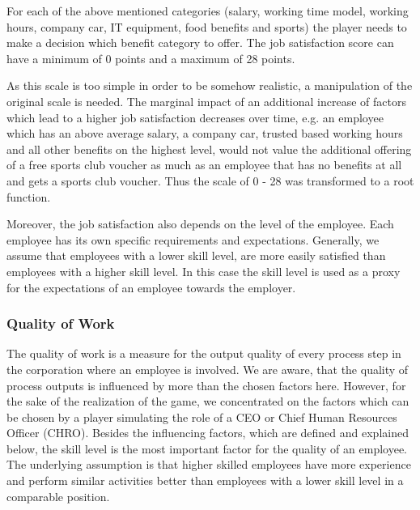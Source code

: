 For each of the above mentioned categories (salary, working time model, working hours, company car, IT equipment, food benefits and sports) the player needs to make a decision which benefit category to offer. The job satisfaction score can have a minimum of 0 points and a maximum of 28 points.

As this scale is too simple in order to be somehow realistic, a manipulation of the original scale is needed. The marginal impact of an additional increase of factors which lead to a higher job satisfaction decreases over time, e.g. an employee which has an above average salary, a company car, trusted based working hours and all other benefits on the highest level, would not value the additional offering of a free sports club voucher as much as an employee that has no benefits at all and gets a sports club voucher. Thus the scale of 0 - 28 was transformed to a root function.

Moreover, the job satisfaction also depends on the level of the employee. Each employee has its own specific requirements and expectations. Generally, we assume that employees with a lower skill level, are more easily satisfied than employees with a higher skill level. In this case the skill level  is used as a proxy for the expectations of an employee towards the employer. 


\subsubsection{Quality of Work}
The quality of work is a measure for the output quality of every process step in the corporation where an employee is involved. We are aware, that the quality of process outputs is influenced by more than the chosen factors here. However, for the sake of the realization of the game, we concentrated on the factors which can be chosen by a player simulating the role of a CEO or Chief Human Resources Officer (CHRO). Besides the influencing factors, which are defined and explained below, the skill level is the most important factor for the quality of an employee. The underlying assumption is that higher skilled employees have more experience and perform similar activities better than employees with a lower skill level in a comparable position.

